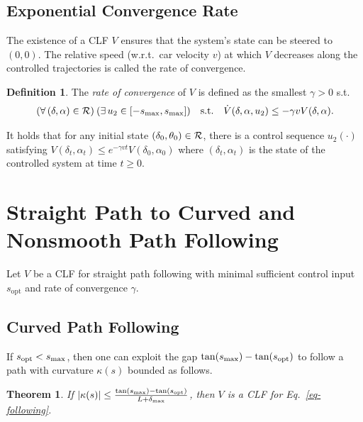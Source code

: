 \documentclass{article}
\theoremstyle{plain}
\newtheorem{theorem}{Theorem}
\theoremstyle{definition}
\newtheorem{definition}{Definition}
\theoremstyle{remark}
\newcommand{\smax}{s_\maxtxt}
\newcommand{\sopt}{s_{\mathrm{opt}}}
\newcommand{\deltamax}{\delta_\maxtxt}
\begin{document}
\subsection{Exponential Convergence Rate}

The existence of a CLF $V$ ensures that the system's state can be steered to $(0,0)$.
The relative speed (w.r.t.~car velocity $v$) at which $V$ decreases along the controlled trajectories is called the rate of convergence.

\begin{definition}\label{def-convergence-rate}
The \emph{rate of convergence} of $V$ is defined as the smallest $\gamma>0$ s.t.
\begin{equation}\label{eq-lie-clf-rate}
(\forall\,(\delta,\alpha)\in\calR)\:(\exists\,u_2\in[-\smax,\smax])
\quad\text{s.t.}\quad \dot{V}(\delta,\alpha,u_2) \leq -\gamma vV(\delta,\alpha).
\end{equation}
\end{definition}

It holds that for any initial state $(\delta_0,\theta_0)\in\mathcal{R}$,
there is a control sequence $u_2(\cdot)$ satisfying
$V(\delta_t,\alpha_t)\leq e^{-\gamma vt}V(\delta_0,\alpha_0)$
where $(\delta_t,\alpha_t)$ is the state of the controlled system at time $t\geq0$.

\section{Straight Path to Curved and Nonsmooth Path Following}\label{sec-curved}

Let $V$ be a CLF for straight path following
with minimal sufficient control input $\sopt$ and rate of convergence $\gamma$.

\subsection{Curved Path Following}

If $\sopt<\smax$, then one can exploit the gap $\tan(\smax)-\tan(\sopt)$
to follow a path with curvature $\kappa(s)$ bounded as follows.

\begin{theorem}\label{thm-straight-curved}
If $\lvert\kappa(s)\rvert\leq \frac{\tan(\smax)-\tan(\sopt)}{L+\deltamax}$, then $V$ is a CLF for Eq.~\eqref{eq-following}.
\end{theorem}
\end{document}

